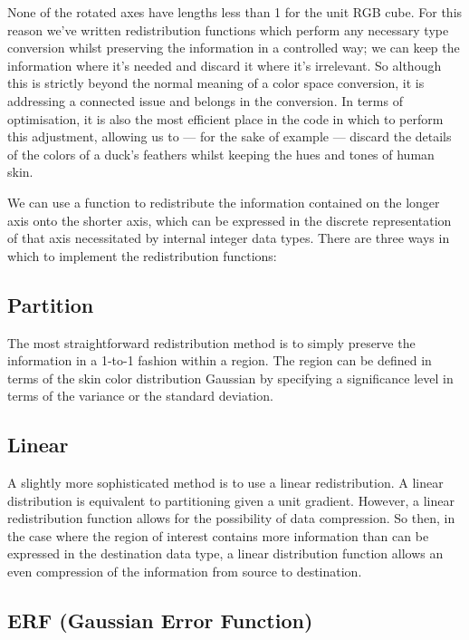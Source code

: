 None of the rotated axes have lengths less than 1 for the unit RGB cube. For this reason we've written redistribution functions which perform any necessary type conversion whilst preserving the information in a controlled way; we can keep the information where it's needed and discard it where it's irrelevant. So although this is strictly beyond the normal meaning of a color space conversion, it is addressing a connected issue and belongs in the conversion. In terms of optimisation, it is also the most efficient place in the code in which to perform this adjustment, allowing us to --- for the sake of example --- discard the details of the colors of a duck's feathers whilst keeping the hues and tones of human skin.

We can use a function to redistribute the information contained on the longer axis onto the shorter axis, which can be expressed in the discrete representation of that axis necessitated by internal integer data types. There are three ways in which to implement the redistribution functions:

\subsection{Partition}\label{sec:Partition}

The most straightforward redistribution method is to simply preserve the information in a 1-to-1 fashion within a region. The region can be defined in terms of the skin color distribution Gaussian by specifying a significance level in terms of the variance or the standard deviation.

\subsection{Linear}\label{sec:Linear}

A slightly more sophisticated method is to use a linear redistribution. A linear distribution is equivalent to partitioning given a unit gradient. However, a linear redistribution function allows for the possibility of data compression. So then, in the case where the region of interest contains more information than can be expressed in the destination data type, a linear distribution function allows an even compression of the information from source to destination.

\subsection{ERF (Gaussian Error Function)}\label{sec:ERF}


